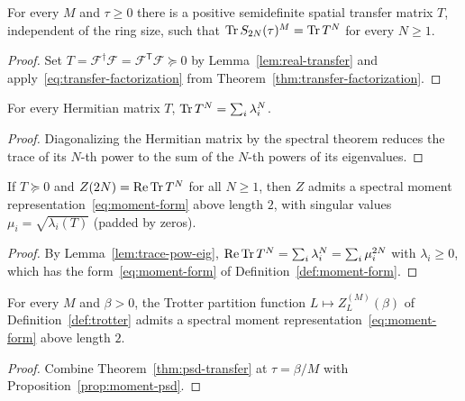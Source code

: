 \begin{theorem}
  \label{thm:psd-transfer}
  \leanok
  For every \(M\) and \(\tau \ge 0\) there is a positive semidefinite spatial transfer matrix \(T\),
  independent of the ring size, such that \(\operatorname{Tr} S_{2N}(\tau)^M = \operatorname{Tr} T^N\) for every \(N \ge 1\).
\end{theorem}
\begin{proof}
  \leanok
  Set \(T = \mathcal F^\dagger \mathcal F = \mathcal F^{\mathsf T} \mathcal F \succeq 0\) by
  Lemma~\ref{lem:real-transfer} and apply~\eqref{eq:transfer-factorization} from
  Theorem~\ref{thm:transfer-factorization}.
\end{proof}

\begin{lemma}
  \label{lem:trace-pow-eig}
  \leanok
  For every Hermitian matrix \(T\), \(\operatorname{Tr} T^N = \sum_i \lambda_i^N\).
\end{lemma}
\begin{proof}
  \leanok
  Diagonalizing the Hermitian matrix by the spectral theorem reduces the trace of its \(N\)-th
  power to the sum of the \(N\)-th powers of its eigenvalues.
\end{proof}

\begin{proposition}
  \label{prop:moment-psd}
  \leanok
  If \(T \succeq 0\) and \(Z(2N) = \operatorname{Re}\operatorname{Tr} T^N\) for all \(N \ge 1\), then \(Z\)
  admits a spectral moment representation~\eqref{eq:moment-form} above length \(2\), with singular
  values \(\mu_i = \sqrt{\lambda_i(T)}\) (padded by zeros).
\end{proposition}
\begin{proof}
  \leanok
  By Lemma~\ref{lem:trace-pow-eig}, \(\operatorname{Re}\operatorname{Tr} T^N = \sum_i \lambda_i^N = \sum_i
  \mu_i^{2N}\)
  with \(\lambda_i \ge 0\), which has the form~\eqref{eq:moment-form} of
  Definition~\ref{def:moment-form}.
\end{proof}

\begin{lemma}
  \label{lem:trotter-moment}
  \leanok
  For every \(M\) and \(\beta > 0\), the Trotter partition function
  \(L \mapsto Z^{(M)}_L(\beta)\) of Definition~\ref{def:trotter} admits a spectral moment
  representation~\eqref{eq:moment-form} above length \(2\).
\end{lemma}
\begin{proof}
  \leanok
  Combine Theorem~\ref{thm:psd-transfer} at \(\tau = \beta/M\) with
  Proposition~\ref{prop:moment-psd}.
\end{proof}


